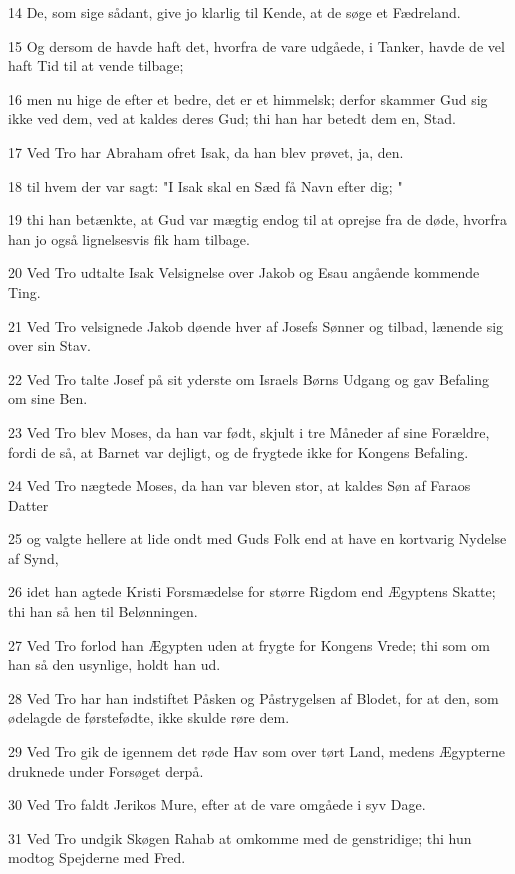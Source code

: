 \par 14 De, som sige sådant, give jo klarlig til Kende, at de søge et Fædreland.
\par 15 Og dersom de havde haft det, hvorfra de vare udgåede, i Tanker, havde de vel haft Tid til at vende tilbage;
\par 16 men nu hige de efter et bedre, det er et himmelsk; derfor skammer Gud sig ikke ved dem, ved at kaldes deres Gud; thi han har betedt dem en, Stad.
\par 17 Ved Tro har Abraham ofret Isak, da han blev prøvet, ja, den.
\par 18 til hvem der var sagt: "I Isak skal en Sæd få Navn efter dig; "
\par 19 thi han betænkte, at Gud var mægtig endog til at oprejse fra de døde, hvorfra han jo også lignelsesvis fik ham tilbage.
\par 20 Ved Tro udtalte Isak Velsignelse over Jakob og Esau angående kommende Ting.
\par 21 Ved Tro velsignede Jakob døende hver af Josefs Sønner og tilbad, lænende sig over sin Stav.
\par 22 Ved Tro talte Josef på sit yderste om Israels Børns Udgang og gav Befaling om sine Ben.
\par 23 Ved Tro blev Moses, da han var født, skjult i tre Måneder af sine Forældre, fordi de så, at Barnet var dejligt, og de frygtede ikke for Kongens Befaling.
\par 24 Ved Tro nægtede Moses, da han var bleven stor, at kaldes Søn af Faraos Datter
\par 25 og valgte hellere at lide ondt med Guds Folk end at have en kortvarig Nydelse af Synd,
\par 26 idet han agtede Kristi Forsmædelse for større Rigdom end Ægyptens Skatte; thi han så hen til Belønningen.
\par 27 Ved Tro forlod han Ægypten uden at frygte for Kongens Vrede; thi som om han så den usynlige, holdt han ud.
\par 28 Ved Tro har han indstiftet Påsken og Påstrygelsen af Blodet, for at den, som ødelagde de førstefødte, ikke skulde røre dem.
\par 29 Ved Tro gik de igennem det røde Hav som over tørt Land, medens Ægypterne druknede under Forsøget derpå.
\par 30 Ved Tro faldt Jerikos Mure, efter at de vare omgåede i syv Dage.
\par 31 Ved Tro undgik Skøgen Rahab at omkomme med de genstridige; thi hun modtog Spejderne med Fred.
